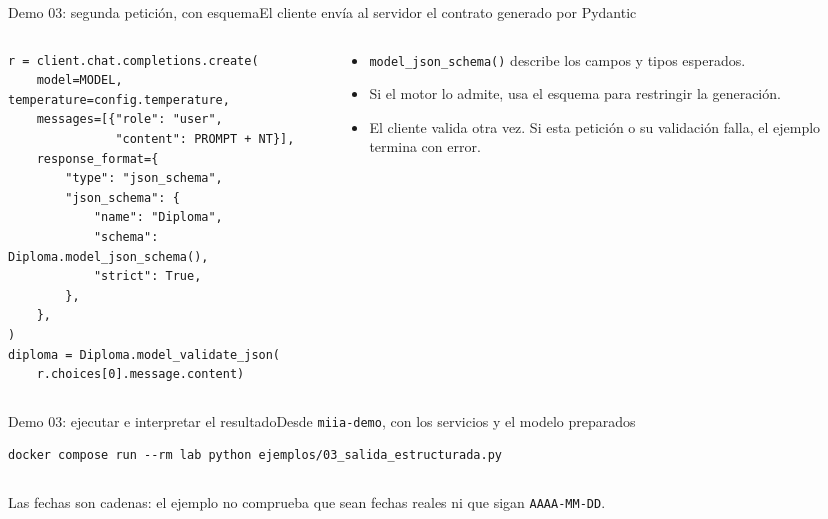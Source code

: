 \begin{frame}[fragile]{Demo 03: segunda petición, con esquema}{El cliente envía al servidor el contrato generado por Pydantic}
	\begin{columns}[T]
		\begin{column}{0.59\textwidth}
			\begin{lstlisting}
r = client.chat.completions.create(
    model=MODEL, temperature=config.temperature,
    messages=[{"role": "user",
               "content": PROMPT + NT}],
    response_format={
        "type": "json_schema",
        "json_schema": {
            "name": "Diploma",
            "schema": Diploma.model_json_schema(),
            "strict": True,
        },
    },
)
diploma = Diploma.model_validate_json(
    r.choices[0].message.content)
\end{lstlisting}
		\end{column}
		\begin{column}{0.39\textwidth}
			\footnotesize
			\begin{itemize}
				\item \texttt{model\_json\_schema()} describe los campos y tipos esperados.
				\item Si el motor lo admite, usa el esquema para restringir la generación.
				\item El cliente valida otra vez. Si esta petición o su validación falla, el ejemplo termina con error.
			\end{itemize}
		\end{column}
	\end{columns}
\end{frame}

\begin{frame}[fragile]{Demo 03: ejecutar e interpretar el resultado}{Desde \texttt{miia-demo}, con los servicios y el modelo preparados}
	\begin{lstlisting}[language={}]
docker compose run --rm lab python ejemplos/03_salida_estructurada.py
\end{lstlisting}
	\begin{columns}[T]
		\begin{column}{0.48\textwidth}
		\end{column}
		\begin{column}{0.48\textwidth}
		\end{column}
	\end{columns}
	{\footnotesize Las fechas son cadenas: el ejemplo no comprueba que sean fechas reales ni que sigan \texttt{AAAA-MM-DD}.}
\end{frame}

